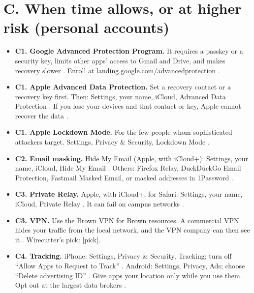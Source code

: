 \documentclass[10pt]{article}
\begin{document}
\section{C. When time allows, or at higher risk (personal accounts)}
\begin{itemize}
\item \textbf{C1. Google Advanced Protection Program.} It requires a passkey or a security key, limits other apps' access to Gmail and Drive, and makes recovery slower \vfy. Enroll at landing.google.com/advancedprotection \vfy.
\item \textbf{C1. Apple Advanced Data Protection.} Set a recovery contact or a recovery key first. Then: Settings, your name, iCloud, Advanced Data Protection \vfy. If you lose your devices and that contact or key, Apple cannot recover the data \vfy.
\item \textbf{C1. Apple Lockdown Mode.} For the few people whom sophisticated attackers target. Settings, Privacy \& Security, Lockdown Mode \vfy.
\item \textbf{C2. Email masking.} Hide My Email (Apple, with iCloud+): Settings, your name, iCloud, Hide My Email \vfy. Others: Firefox Relay, DuckDuckGo Email Protection, Fastmail Masked Email, or masked addresses in 1Password \vfy.
\item \textbf{C3. Private Relay.} Apple, with iCloud+, for Safari: Settings, your name, iCloud, Private Relay \vfy. It can fail on campus networks \vfy.
\item \textbf{C3. VPN.} Use the Brown VPN for Brown resources. A commercial VPN hides your traffic from the local network, and the VPN company can then see it \vfy. Wirecutter's pick: [pick].


\item \textbf{C4. Tracking.} iPhone: Settings, Privacy \& Security, Tracking; turn off ``Allow Apps to Request to Track'' \vfy. Android: Settings, Privacy, Ads; choose ``Delete advertising ID'' \vfy. Give apps your location only while you use them. Opt out at the largest data brokers \vfy.
\end{itemize}
\end{document}
